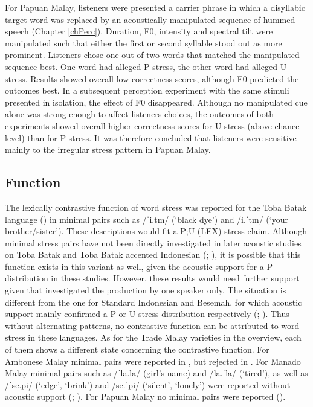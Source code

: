 For Papuan Malay, listeners were presented a carrier phrase in which a disyllabic target word was replaced by an acoustically manipulated sequence of hummed speech (Chapter \ref{chPerc}). Duration, F0, intensity and spectral tilt were manipulated such that either the first or second syllable stood out as more prominent. Listeners chose one out of two words that matched the manipulated sequence best. One word had alleged P stress, the other word had alleged U stress. Results showed overall low correctness scores, although F0 predicted the outcomes best. In a subsequent perception experiment with the same stimuli presented in isolation, the effect of F0 disappeared. Although no manipulated cue alone was strong enough to affect listeners choices, the outcomes of both experiments showed overall higher correctness scores for U stress (above chance level) than for P stress. It was therefore concluded that listeners were sensitive mainly to the irregular stress pattern in Papuan Malay.

\subsection{Function} \label{sec523}
The lexically contrastive function of word stress was reported for the Toba Batak language (\citealt[23]{nababan_grammar_1981}) in minimal pairs such as /ˈi.tm/ (`black dye') and /i.ˈtm/ (`your brother/sister'). These descriptions would fit a P;U (LEX) stress claim. Although minimal stress pairs have not been directly investigated in later acoustic studies on Toba Batak and Toba Batak accented Indonesian (\citealt{roosman_phonetic_2006}; \citealt{goedemans_stress_2007}), it is possible that this function exists in this variant as well, given the acoustic support for a P distribution in these studies. However, these results would need further support given that \citet{goedemans_stress_2007} investigated the production by one speaker only. The situation is different from the one for Standard Indonesian and Besemah, for which acoustic support mainly confirmed a P or U stress distribution respectively (\citealt{laksman_location_1994}; \citealt{mcdonnell_acoustic_2016}). Thus without alternating patterns, no contrastive function can be attributed to word stress in these languages. As for the Trade Malay varieties in the overview, each of them shows a different state concerning the contrastive function. For Ambonese Malay minimal pairs were reported in \citet{vanminde_malayu_1997}, but rejected in \citet{maskikit-essed_no_2016}. For Manado Malay minimal pairs such as /ˈla.la/ (girl's name) and /la.ˈla/ (`tired'), as well as /ˈse.pi/ (`edge', `brink') and /se.ˈpi/ (`silent', `lonely') were reported without acoustic support (\citealt{stoel_focus_2005}; \citealt{prentice_manado_1994}). For Papuan Malay no minimal pairs were reported (\citealt{kluge_grammar_2017}).\par

